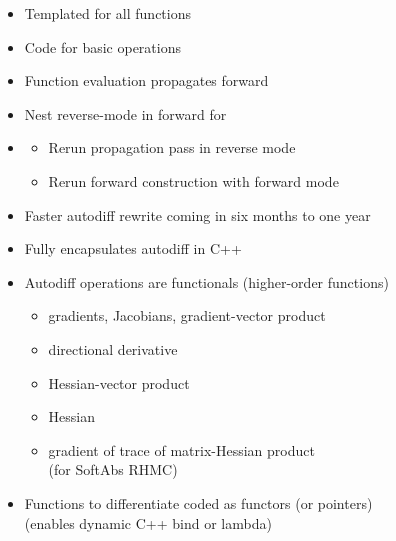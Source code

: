 \documentclass[10pt]{report}
\newcommand{\sld}[1]{\newpage{\noindent\LARGE \ \ \
    \textcolor{MidnightBlue}{\bfseries #1}}\vspace*{4pt}}
\newcommand{\myemph}[1]{{\color{MidnightBlue}{\bfseries #1}}}
\begin{document}
\sld{Forward-Mode Auto Diff}
\begin{itemize}
\item Templated \myemph{C++ overload} for all functions
\item Code \myemph{partial derivatives} for basic operations
\item Function evaluation propagates \myemph{chain rule} forward
\item Nest reverse-mode in forward for \myemph{higher-order}
\item \myemph{Jacobians}
  \vspace*{-4pt}
  \begin{itemize}\small
  \item Rerun propagation pass in reverse mode
  \item Rerun forward construction with forward mode
  \end{itemize}
  \vfill
\item Faster autodiff rewrite coming in six months to one year
\end{itemize}

\sld{Autodiff Functionals}

\begin{itemize}
\item Fully encapsulates autodiff in C++
\item Autodiff operations are functionals {\footnotesize (higher-order functions)}
  \begin{itemize}\small
  \item gradients, Jacobians, gradient-vector product
  \item directional derivative
  \item Hessian-vector product
  \item Hessian
  \item gradient of trace of matrix-Hessian product
    \\ {\footnotesize (for SoftAbs RHMC)}
  \end{itemize}
\item Functions to differentiate coded as functors (or pointers)
  \\ {\footnotesize (enables dynamic C++ bind or lambda)}
\end{itemize}
\end{document}
